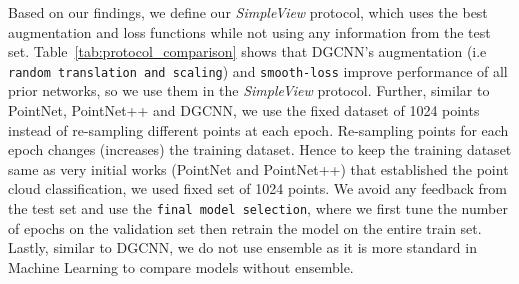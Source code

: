 \documentclass{article}
\newcommand{\comment}[1]{}
\newcommand\method{SimpleView}
\newcommand{\smallsec}[1]{\noindent {\bf #1:}}
\begin{document}
\smallsec{Our Protocol}
Based on our findings, we define our \textit{\method{}} protocol, which uses the best augmentation and loss functions while not using any information from the test set. Table~\ref{tab:protocol_comparison} shows that DGCNN's augmentation (i.e \texttt{random translation and scaling}) and \texttt{smooth-loss} improve performance of all prior networks, so we use them in the \textit{\method{}} protocol. Further, similar to PointNet, PointNet++ and DGCNN, we use the fixed dataset of 1024 points instead of re-sampling different points at each epoch. Re-sampling points for each epoch changes (increases) the training dataset. Hence to keep the training dataset same as very initial works (PointNet and PointNet++) that established the point cloud classification, we used fixed  set of 1024 points. We avoid any feedback from the test set and use the \texttt{final model selection}, where we first tune the number of epochs on the validation set then retrain the model on the entire train set. Lastly, similar to DGCNN, we do not use ensemble as it is more standard in Machine Learning to compare models without ensemble. 
\comment{We strongly disagree with using any feedback from the test set to select the final model. Using the best performing model on the test set breaks the held-out blind test set assumption, hence the performance on the test set is no longer a reliable indicator of generalization, which is a central goal in machine learning~\citep{bishop2006pattern}.}
\end{document}
